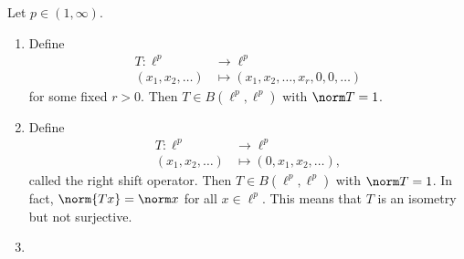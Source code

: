 \documentclass[a4paper]{article}
\begin{document}
\begin{eg}
  Let \(p \in (1, \infty)\).
  \begin{enumerate}
  \item Define
    \begin{align*}
      T: \ell^p &\to \ell^p \\
      (x_1, x_2, \dots) &\mapsto (x_1, x_2, \dots, x_r, 0, 0, \dots)
    \end{align*}
    for some fixed \(r > 0\). Then \(T \in B(\ell^p, \ell^p)\) with \(\norm T = 1\).
  \item Define
    \begin{align*}
      T: \ell^p &\to \ell^p \\
      (x_1, x_2, \dots) &\mapsto (0, x_1, x_2, \dots ),
    \end{align*}
    called the right shift operator. Then \(T \in B(\ell^p, \ell^p)\) with \(\norm T = 1\). In fact, \(\norm{Tx} = \norm x\) for all \(x \in \ell^p\). This means that \(T\) is an isometry but not surjective.
  \item 
  \end{enumerate}
\end{eg}









\printindex
\end{document}
